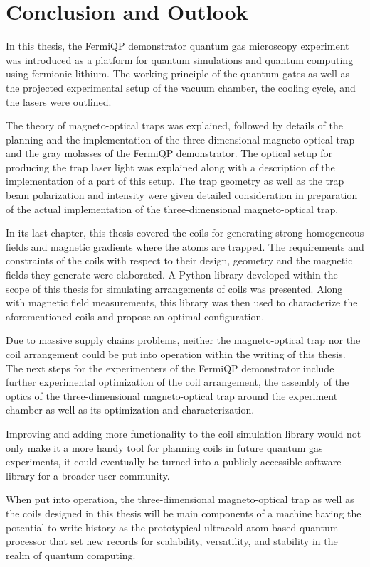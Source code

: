 \renewcommand{\imagepath}{../50-outro/img}

\chapter{Conclusion and Outlook}
In this thesis, the FermiQP demonstrator quantum gas microscopy experiment was introduced as a platform for quantum simulations and quantum computing using fermionic lithium. The working principle of the quantum gates as well as the projected experimental setup of the vacuum chamber, the cooling cycle, and the lasers were outlined.

The theory of magneto-optical traps was explained, followed by details of the planning and the implementation of the three-dimensional magneto-optical trap and the gray molasses of the FermiQP demonstrator. The optical setup for producing the trap laser light was explained along with a description of the implementation of a part of this setup. The trap geometry as well as the trap beam polarization and intensity were given detailed consideration in preparation of the actual implementation of the three-dimensional magneto-optical trap.

In its last chapter, this thesis covered the coils for generating strong homogeneous fields and magnetic gradients where the atoms are trapped. The requirements and constraints of the coils with respect to their design, geometry and the magnetic fields they generate were elaborated. A Python library developed within the scope of this thesis  for simulating arrangements of coils was presented. Along with magnetic field measurements, this library was then used to characterize the aforementioned coils and propose an optimal configuration.

Due to massive supply chains problems, neither the magneto-optical trap nor the coil arrangement could be put into operation within the writing of this thesis. The next steps for the experimenters of the FermiQP demonstrator include further experimental optimization of the coil arrangement, the assembly of the optics of the three-dimensional magneto-optical trap around the experiment chamber as well as its optimization and  characterization.

Improving and adding more functionality to the coil simulation library would not only make it a more handy tool for planning coils in future quantum gas experiments, it could eventually be turned into a publicly accessible software library for a broader user community.

When put into operation, the three-dimensional magneto-optical trap as well as the coils designed in this thesis will be main components of a machine having the potential to write history as the prototypical ultracold atom-based quantum processor that set new records for scalability, versatility, and stability in the realm of quantum computing.